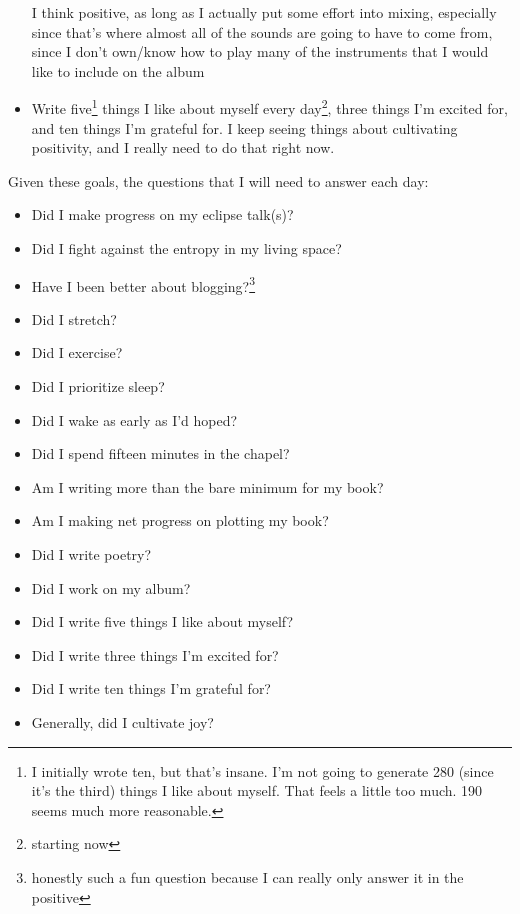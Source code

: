 \documentclass[12pt]{article}[titlepage]
\renewcommand{\,}{\textsuperscript{,}}
\begin{document}
\begin{itemize}
{I think positive, as long as I actually put some effort into mixing, especially since that's where almost all of the sounds are going to have to come from, since I don't own/know how to play many of the instruments that I would like to include on the album}
\item Write five\footnote{I initially wrote ten, but that's insane.
I'm not going to generate 280 (since it's the third) things I like about myself.
That feels a little too much.
190 seems much more reasonable.} things I like about myself every day\footnote{starting now}, three things I'm excited for, and ten things I'm grateful for.
I keep seeing things about cultivating positivity, and I really need to do that right now.
\end{itemize}
Given these goals, the questions that I will need to answer each day:
\begin{itemize}
\item Did I make progress on my eclipse talk(s)?
\item Did I fight against the entropy in my living space?
\item Have I been better about blogging?\footnote{honestly such a fun question because I can really only answer it in the positive}
\item Did I stretch?
\item Did I exercise?
\item Did I prioritize sleep?
\item Did I wake as early as I'd hoped?
\item Did I spend fifteen minutes in the chapel?
\item Am I writing more than the bare minimum for my book?
\item Am I making net progress on plotting my book?
\item Did I write poetry?
\item Did I work on my album?
\item Did I write five things I like about myself?
\item Did I write three things I'm excited for?
\item Did I write ten things I'm grateful for?
\item Generally, did I cultivate joy?
\end{itemize}
\end{document}
